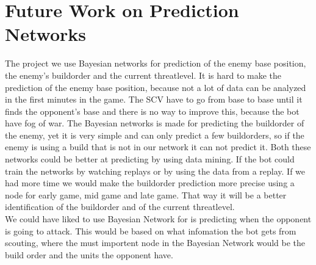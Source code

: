 \section{Future Work on Prediction Networks}
	The project we use Bayesian networks for prediction of the enemy base position, the enemy's buildorder and the current threatlevel. 
	It is hard to make the prediction of the enemy base position, because not a lot of data can be analyzed in the first minutes in the game. The
	SCV have to go from base to base until it finds the opponent's base and there is no way to improve this, because the bot have fog of war.
	The Bayesian networks is made for predicting the buildorder of the enemy, yet it is very simple and can only predict a few buildorders, so if the enemy 		is using a build that is not in our network it can not predict it. Both these networks could be better at predicting by using data mining. If the 
	bot could train the networks by watching replays or by using the data from a replay. If we had more time we would make the buildorder prediction 
	more precise using a node for early game, mid game and late game. That way it will be a better identification of the buildorder and of the current 
	threatlevel. \\
		We could have liked to use Bayesian Network for is predicting when the opponent is going to attack. This would be based on what 				infomation the bot gets from scouting, where the must importent node in the Bayesian Network would be the build order and the units the opponent
	have. 